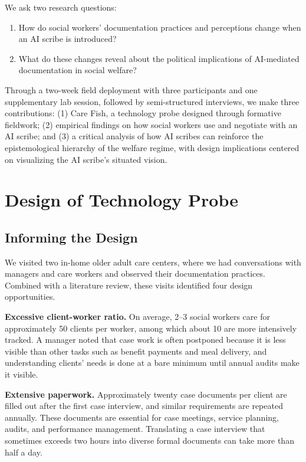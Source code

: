 \documentclass{article}
\begin{document}
We ask two research questions:
\begin{enumerate}
\item How do social workers' documentation practices and perceptions change when an AI scribe is introduced?
\item What do these changes reveal about the political implications of AI-mediated documentation in social welfare?
\end{enumerate}

Through a two-week field deployment with three participants and one supplementary lab session, followed by semi-structured interviews, we make three contributions: (1) Care Fish, a technology probe designed through formative fieldwork; (2) empirical findings on how social workers use and negotiate with an AI scribe; and (3) a critical analysis of how AI scribes can reinforce the epistemological hierarchy of the welfare regime, with design implications centered on visualizing the AI scribe's situated vision.

\section{Design of Technology Probe}

\subsection{Informing the Design}

We visited two in-home older adult care centers, where we had conversations with managers and care workers and observed their documentation practices. Combined with a literature review, these visits identified four design opportunities.

\textbf{Excessive client-worker ratio.} On average, 2--3 social workers care for approximately 50 clients per worker, among which about 10 are more intensively tracked. A manager noted that case work is often postponed because it is less visible than other tasks such as benefit payments and meal delivery, and understanding clients' needs is done at a bare minimum until annual audits make it visible.

\textbf{Extensive paperwork.} Approximately twenty case documents per client are filled out after the first case interview, and similar requirements are repeated annually. These documents are essential for case meetings, service planning, audits, and performance management. Translating a case interview that sometimes exceeds two hours into diverse formal documents can take more than half a day.
\end{document}
